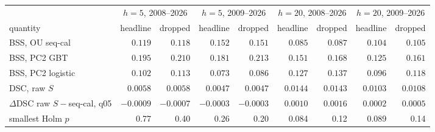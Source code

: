 \begin{tabular}{lrrrrrrrr}\toprule
 & \multicolumn{2}{c}{$h=5$, 2008--2026} & \multicolumn{2}{c}{$h=5$, 2009--2026} & \multicolumn{2}{c}{$h=20$, 2008--2026} & \multicolumn{2}{c}{$h=20$, 2009--2026}\\
quantity & headline & dropped & headline & dropped & headline & dropped & headline & dropped\\\midrule
BSS, OU seq-cal & $0.119$ & $0.118$ & $0.152$ & $0.151$ & $0.085$ & $0.087$ & $0.104$ & $0.105$\\
BSS, PC2 GBT & $0.195$ & $0.210$ & $0.181$ & $0.213$ & $0.151$ & $0.168$ & $0.125$ & $0.161$\\
BSS, PC2 logistic & $0.102$ & $0.113$ & $0.073$ & $0.086$ & $0.127$ & $0.137$ & $0.096$ & $0.118$\\
DSC, raw $S$ & $0.0058$ & $0.0058$ & $0.0047$ & $0.0047$ & $0.0144$ & $0.0143$ & $0.0103$ & $0.0108$\\
$\Delta$DSC raw $S-$seq-cal, q05 & $-0.0009$ & $-0.0007$ & $-0.0003$ & $-0.0003$ & $0.0010$ & $0.0016$ & $0.0002$ & $0.0005$\\
smallest Holm $p$ & 0.77 & 0.40 & 0.26 & 0.20 & 0.084 & 0.12 & 0.089 & 0.14\\
\bottomrule\end{tabular}
